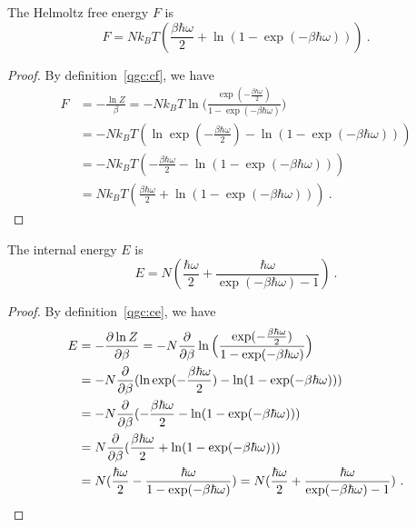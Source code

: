     The Helmoltz free energy $F$ is 
    \begin{equation*}
        F = N k_B T ( \frac{\beta \hbar \omega}{2} + \ln (1 - \exp(- \beta \hbar \omega))) ~.
    \end{equation*}
    \begin{proof}
        By definition~\eqref{qgc:cf}, we have
        \begin{equation*}
        \begin{aligned}
            F & = - \frac{\ln Z}{\beta} = - N k_B T \ln \Big ( \frac{\exp(- \frac{\beta \hbar \omega}{2})}{1 - \exp(- \beta \hbar \omega)} \Big) \\ & = - N k_B T ( \ln \exp(- \frac{\beta \hbar \omega}{2}) - \ln (1 - \exp(- \beta \hbar \omega) )) \\ & = - N k_B T ( - \frac{\beta \hbar \omega}{2} - \ln (1 - \exp(- \beta \hbar \omega))) \\ & = N k_B T ( \frac{\beta \hbar \omega}{2} + \ln (1 - \exp(- \beta \hbar \omega))) ~.
        \end{aligned}
        \end{equation*}
    \end{proof}

    The internal energy $E$ is 
    \begin{equation*}
        E = N ( \frac{\hbar \omega}{2} + \frac{\hbar \omega}{\exp(- \beta \hbar \omega) - 1} ) ~.
    \end{equation*}
    \begin{proof}
        By definition~\eqref{qgc:ce}, we have
        \begin{equation*}
        \begin{aligned}
            E & = - \frac{\partial\ln Z}{\partial\beta} = - N \frac{\partial}{\partial\beta} \ln \Big ( \frac{\exp(- \frac{\beta \hbar \omega}{2})}{1 - \exp(- \beta \hbar \omega)} \Big) \\ & = - N \frac{\partial}{\partial\beta} ( \ln \exp(- \frac{\beta \hbar \omega}{2}) - \ln (1 - \exp(- \beta \hbar \omega) )) \\ & = - N \frac{\partial}{\partial\beta} ( - \frac{\beta \hbar \omega}{2} - \ln (1 - \exp(- \beta \hbar \omega))) \\ & = N \frac{\partial}{\partial\beta} ( \frac{\beta \hbar \omega}{2} + \ln (1 - \exp(- \beta \hbar \omega))) \\ & = N ( \frac{\hbar \omega}{2} - \frac{\hbar \omega}{1 - \exp(- \beta \hbar \omega)} ) = N ( \frac{\hbar \omega}{2} + \frac{\hbar \omega}{\exp(- \beta \hbar \omega) - 1} ) ~.
        \end{aligned}
        \end{equation*}
    \end{proof}

